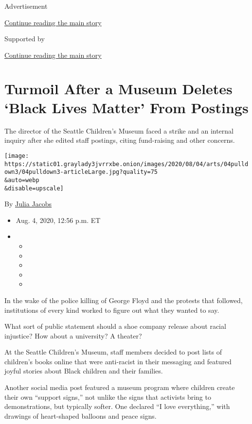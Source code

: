 Advertisement

\protect\hyperlink{after-top}{Continue reading the main story}

Supported by

\protect\hyperlink{after-sponsor}{Continue reading the main story}

\hypertarget{turmoil-after-a-museum-deletes-black-lives-matter-from-postings}{%
\section{Turmoil After a Museum Deletes `Black Lives Matter' From
Postings}\label{turmoil-after-a-museum-deletes-black-lives-matter-from-postings}}

The director of the Seattle Children's Museum faced a strike and an
internal inquiry after she edited staff postings, citing fund-raising
and other concerns.

\texttt{[image: https://static01.graylady3jvrrxbe.onion/images/2020/08/04/arts/04pulldown3/04pulldown3-articleLarge.jpg?quality=75\\\&auto=webp\\\&disable=upscale]}

By \href{https://www.nytimes3xbfgragh.onion/by/julia-jacobs}{Julia
Jacobs}

\begin{itemize}
\item
  Aug. 4, 2020, 12:56 p.m. ET
\item
  \begin{itemize}
  \item
  \item
  \item
  \item
  \item
  \end{itemize}
\end{itemize}

In the wake of the police killing of George Floyd and the protests that
followed, institutions of every kind worked to figure out what they
wanted to say.

What sort of public statement should a shoe company release about racial
injustice? How about a university? A theater?

At the Seattle Children's Museum, staff members decided to post lists of
children's books online that were anti-racist in their messaging and
featured joyful stories about Black children and their families.

Another social media post featured a museum program where children
create their own ``support signs,'' not unlike the signs that activists
bring to demonstrations, but typically softer. One declared ``I love
everything,'' with drawings of heart-shaped balloons and peace signs.

